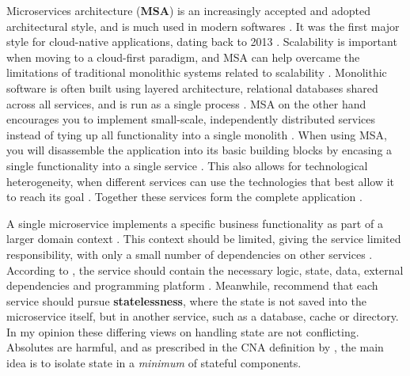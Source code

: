 \documentclass[utf8,english]{gradu3}
\begin{document}
Microservices architecture (\textbf{MSA}) is an increasingly accepted and
adopted architectural style, and is much used in modern softwares
\parencite[10]{Vale2022}. It was the first major style for cloud-native
applications, dating back to 2013 \parencite[18]{Gannon2017}. Scalability is
important when moving to a cloud-first paradigm, and MSA can help overcame the
limitations of traditional monolithic systems related to scalability
\parencite[10]{Vale2022}. Monolithic software is often built using layered
architecture, relational databases shared across all services, and is run as a
single process \parencite{Microsoft2022-CNA}. MSA on the other hand encourages you
to implement small-scale, independently distributed services instead of tying up
all functionality into a single monolith \parencite[1]{Li2021}. When using MSA,
you will disassemble the application into its basic building blocks by encasing
a single functionality into a single service \parencite[18]{Gannon2017}. This
also allows for technological heterogeneity, when different services can use the
technologies that best allow it to reach its goal \parencite[18]{Li2021}.
Together these services form the complete application \parencite{Microsoft2022-CNA}.

A single microservice implements a specific business functionality as part of a
larger domain context \parencite{Microsoft2022-CNA}. This context should be limited,
giving the service limited responsibility, with only a small number of
dependencies on other services \parencite[18]{Gannon2017}. According to
\textcite{Microsoft2022-CNA}, the service should contain the necessary logic, state,
data, external dependencies and programming platform \parencite{Microsoft2022-CNA}.
Meanwhile, \textcite[18]{Gannon2017} recommend that each service should pursue
\textbf{statelessness}, where the state is not saved into the microservice
itself, but in another service, such as a database, cache or directory. In my
opinion these differing views on handling state are not conflicting. Absolutes
are harmful, and as prescribed in the CNA definition by
\textcite[13]{Kratzke2017}, the main idea is to isolate state in a
\textit{minimum} of stateful components.
\end{document}
